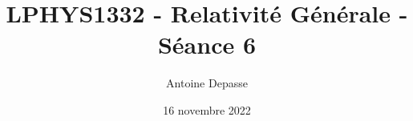 \documentclass{article}
\begin{document}
	
\title{LPHYS1332 - Relativité Générale - Séance 6 }
\author{Antoine Depasse}
\date{16 novembre 2022}
\maketitle
	
	
\end{document}
